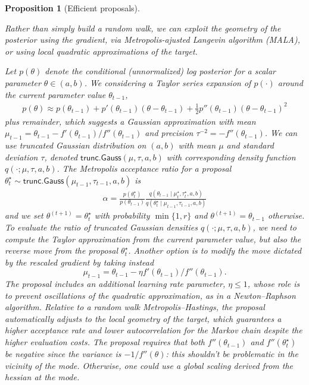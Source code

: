\documentclass[
  11pt,
  letterpaper,
]{scrbook}
\theoremstyle{definition}
\theoremstyle{plain}
\newtheorem{proposition}{Proposition}[chapter]
\theoremstyle{plain}
\theoremstyle{definition}
\theoremstyle{definition}
\theoremstyle{remark}
\begin{document}
\begin{proposition}[Efficient
proposals]\protect\hypertarget{prp-mala}{}\label{prp-mala}

Rather than simply build a random walk, we can exploit the geometry of
the posterior using the gradient, via Metropolis-ajusted Langevin
algorithm (MALA), or using local quadratic approximations of the target.

Let \(p(\theta)\) denote the conditional (unnormalized) log posterior
for a scalar parameter \(\theta \in (a, b)\). We considering a Taylor
series expansion of \(p(\cdot)\) around the current parameter value
\(\theta_{t-1}\), \begin{align*}
 p(\theta) \approx p(\theta_{t-1}) + p'(\theta_{t-1})(\theta - \theta_{t-1}) + \frac{1}{2} p''(\theta_{t-1})(\theta - \theta_{t-1})^2
\end{align*} plus remainder, which suggests a Gaussian approximation
with mean
\(\mu_{t-1} = \theta_{t-1} - f'(\theta_{t-1})/f''(\theta_{t-1})\) and
precision \(\tau^{-2} = -f''(\theta_{t-1})\). We can use truncated
Gaussian distribution on \((a, b)\) with mean \(\mu\) and standard
deviation \(\tau\), denoted \(\mathsf{trunc. Gauss}(\mu, \tau, a, b)\)
with corresponding density function \(q(\cdot; \mu, \tau, a, b)\). The
Metropolis acceptance ratio for a proposal
\(\theta^{\star}_{t} \sim \mathsf{trunc. Gauss}(\mu_{t-1}, \tau_{t-1}, a, b)\)
is \begin{align*}
 \alpha = \frac{p(\theta^{\star}_{t})}{p(\theta_{t-1})} \frac{ q(\theta_{t-1} \mid \mu_{t}^{\star}, \tau_{t}^{\star}, a, b)}{q(\theta^{\star}_{t} \mid \mu_{t-1}, \tau_{t-1}, a, b)}
\end{align*} and we set \(\theta^{(t+1)} = \theta^{\star}_{t}\) with
probability \(\min\{1, r\}\) and \(\theta^{(t+1)} = \theta_{t-1}\)
otherwise. To evaluate the ratio of truncated Gaussian densities
\(q(\cdot; \mu, \tau, a, b)\), we need to compute the Taylor
approximation from the current parameter value, but also the reverse
move from the proposal \(\theta^{\star}_{t}\). Another option is to
modify the move dictated by the rescaled gradient by taking instead
\[\mu_{t-1} = \theta_{t-1} - \eta f'(\theta_{t-1})/f''(\theta_{t-1}).\]
The proposal includes an additional learning rate parameter,
\(\eta \leq 1\), whose role is to prevent oscillations of the quadratic
approximation, as in a Newton--Raphson algorithm. Relative to a random
walk Metropolis--Hastings, the proposal automatically adjusts to the
local geometry of the target, which guarantees a higher acceptance rate
and lower autocorrelation for the Markov chain despite the higher
evaluation costs. The proposal requires that both \(f''(\theta_{t-1})\)
and \(f''(\theta^{\star}_{t})\) be negative since the variance is
\(-1/f''(\theta)\): this shouldn't be problematic in the vicinity of the
mode. Otherwise, one could use a global scaling derived from the hessian
at the mode.


\end{proposition}
\end{document}
